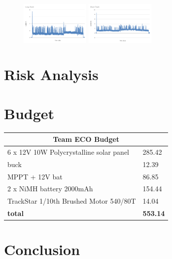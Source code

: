 \documentclass[11pt]{article}
\begin{document}
\begin{figure}[h!]
    \begin{center}
        \includegraphics[width=0.3\textwidth]{inc/long_lap.png}
        \includegraphics[width=0.3\textwidth]{inc/short_lap.png}
    \end{center}
\end{figure}

\section{Risk Analysis}

\section{Budget}

\begin{table}[h!]
    \begin{center}        
    \begin{tabular}{|l|l|}
    \hline
    \multicolumn{2}{|c|}{\textbf{Team ECO Budget}}            \\ \hline
    6 x 12V 10W Polycrystalline solar panel & 285.42 \\ \hline
    buck                                    & 12.39  \\ \hline
    MPPT + 12V bat                          & 86.85  \\ \hline
    2 x NiMH battery 2000mAh                & 154.44 \\ \hline
    TrackStar 1/10th Brushed Motor 540/80T  & 14.04  \\ \hline
    \textbf{total}                          & \textbf{553.14} \\ \hline
    \end{tabular}
    \end{center}
    \end{table}
\section{Conclusion}



\end{document}
